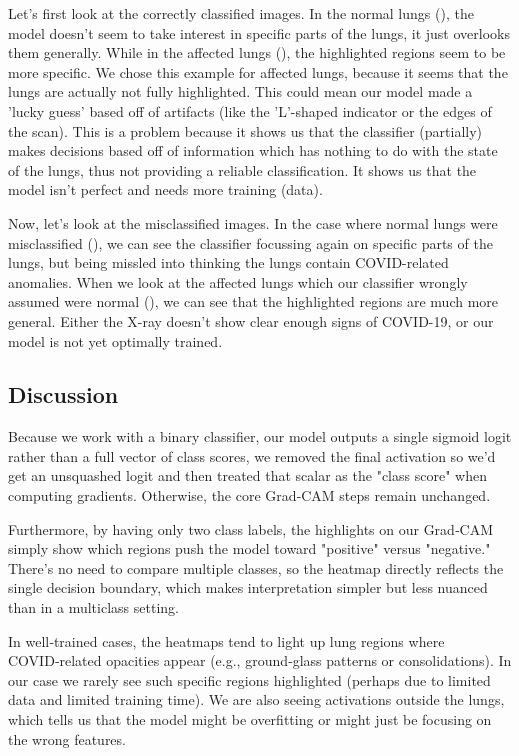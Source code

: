 \documentclass[conference]{IEEEtran}
\begin{document}
Let's first look at the correctly classified images. In the normal lungs (), the model doesn't seem to take interest in specific parts of the lungs, it just overlooks them generally. While in the affected lungs (), the highlighted regions seem to be more specific. We chose this example for affected lungs, because it seems that the lungs are actually not fully highlighted. This could mean our model made a 'lucky guess' based off of artifacts (like the 'L'-shaped indicator or the edges of the scan). This is a problem because it shows us that the classifier (partially) makes decisions based off of information which has nothing to do with the state of the lungs, thus not providing a reliable classification. It shows us that the model isn't perfect and needs more training (data).

Now, let's look at the misclassified images. In the case where normal lungs were misclassified (), we can see the classifier focussing again on specific parts of the lungs, but being missled into thinking the lungs contain COVID-related anomalies. When we look at the affected lungs which our classifier wrongly assumed were normal (), we can see that the highlighted regions are much more general. Either the X-ray doesn't show clear enough signs of COVID-19, or our model is not yet optimally trained.

\subsection{Discussion}
Because we work with a binary classifier, our model outputs a single sigmoid logit rather than a full vector of class scores, we removed the final activation so we'd get an unsquashed logit and then treated that scalar as the "class score" when computing gradients. Otherwise, the core Grad‑CAM steps remain unchanged.

Furthermore, by having only two class labels, the highlights on our Grad‑CAM simply show which regions push the model toward "positive" versus "negative." There's no need to compare multiple classes, so the heatmap directly reflects the single decision boundary, which makes interpretation simpler but less nuanced than in a multiclass setting.

In well‑trained cases, the heatmaps tend to light up lung regions where COVID‑related opacities appear (e.g., ground‑glass patterns or consolidations). In our case we rarely see such specific regions highlighted (perhaps due to limited data and limited training time). We are also seeing activations outside the lungs, which tells us that the model might be overfitting or might just be focusing on the wrong features.
\end{document}
